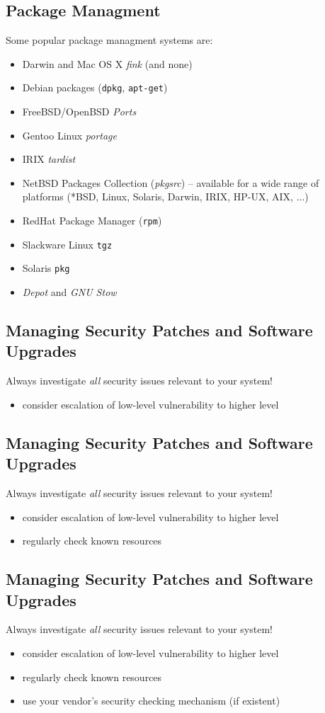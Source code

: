 \documentclass[xga]{xdvislides}
\begin{document}
\subsection{Package Managment}
Some popular package managment systems are:
\begin{itemize}
	\item Darwin and Mac OS X {\em fink} (and none)
	\item Debian packages (\verb+dpkg+, \verb+apt-get+)
	\item FreeBSD/OpenBSD {\em Ports}
	\item Gentoo Linux {\em portage}
	\item IRIX {\em tardist}
	\item NetBSD Packages Collection ({\em pkgsrc}) -- available for a
		wide range of platforms (*BSD, Linux, Solaris, Darwin, IRIX,
		HP-UX, AIX, ...)
	\item RedHat Package Manager (\verb+rpm+)
	\item Slackware Linux \verb+tgz+
	\item Solaris \verb+pkg+
	\item {\em Depot} and {\em GNU Stow}
\end{itemize}

\subsection{Managing Security Patches and Software Upgrades}
Always investigate {\em all} security issues relevant to your system!
\begin{itemize}
	\item consider escalation of low-level vulnerability to higher level
\end{itemize}

\subsection{Managing Security Patches and Software Upgrades}
Always investigate {\em all} security issues relevant to your system!
\begin{itemize}
	\item consider escalation of low-level vulnerability to higher level
	\item regularly check known resources
\end{itemize}

\subsection{Managing Security Patches and Software Upgrades}
Always investigate {\em all} security issues relevant to your system!
\begin{itemize}
	\item consider escalation of low-level vulnerability to higher level
	\item regularly check known resources
	\item use your vendor's security checking mechanism (if existent)
\end{itemize}
\end{document}
